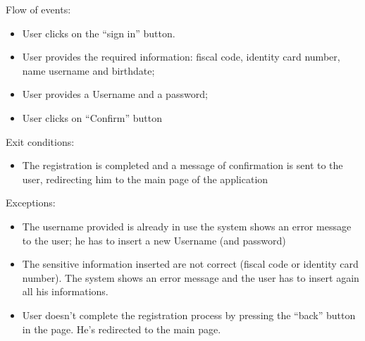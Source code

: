 \documentclass[a4paper]{report}
\begin{document}
Flow of events:
\begin{itemize}
\item User clicks on the “sign in” button.
\item User provides the required information: fiscal code, identity card number, name username and birthdate;
\item User provides a Username and a password;
\item User clicks on “Confirm” button
\end{itemize}
Exit conditions: 
\begin{itemize}
\item The registration is completed and a message of confirmation is sent to the user, redirecting him to the main page of the application
\end{itemize} 
Exceptions: 
\begin{itemize}
\item The username provided is already in use the system shows an error message to the user; he has to insert a new Username (and password)
\item The sensitive information inserted are not correct (fiscal code or identity card number). The system shows an error message and the user has to insert again all his informations.
\item User doesn’t complete the registration process by pressing the “back” button in the page. He’s redirected to the main page.
\end{itemize}
\end{document}
